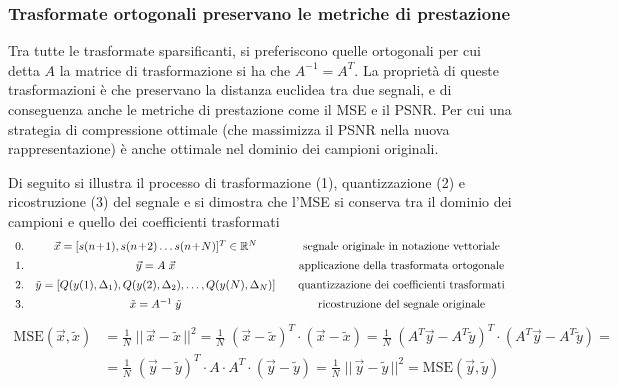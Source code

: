\subsubsection*{Trasformate ortogonali preservano le metriche di prestazione}
Tra tutte le trasformate sparsificanti, si preferiscono quelle ortogonali per cui detta \(A\) la matrice di trasformazione
si ha che \(A^{-1} = A^T\). La proprietà di queste trasformazioni è che preservano la distanza euclidea tra due segnali,
e di conseguenza anche le metriche di prestazione come il MSE e il PSNR. Per cui una strategia di compressione ottimale
(che massimizza il PSNR nella nuova rappresentazione) è anche ottimale nel dominio dei campioni originali.

Di seguito si illustra il processo di trasformazione (1), quantizzazione (2) e ricostruzione (3) del segnale e si dimostra
che l'MSE si conserva tra il dominio dei campioni e quello dei coefficienti trasformati
\[\begin{array}{c c c}
	0. & \vec{x} = [s(n\!+\!1), s(n\!+\!2) \ldots s(n\!+\!N)]^T \in \mathbb{R}^N
	& \quad \text{segnale originale in notazione vettoriale}
	\\[5pt]
	1. & \vec{y} = A \; \vec{x}
	& \quad \text{applicazione della trasformata ortogonale}
	\\[5pt]
	2. & \tilde{y} = [Q(y(1), \Delta_1), Q(y(2), \Delta_2), \ldots, Q(y(N), \Delta_N)]
	& \quad \text{quantizzazione dei coefficienti trasformati}
	\\[5pt]
	3. & \tilde{x} = A^{-1} \; \tilde{y}
	& \quad \text{ricostruzione del segnale originale}
\end{array}\]
\vspace{-10pt}
\begin{align*}
	\text{MSE}(\vec{x}, \tilde{x}) &= \frac{1}{N} \; || \, \vec{x} - \tilde{x} \, ||^2 = \frac{1}{N} \; (\vec{x} - \tilde{x})^T \cdot (\vec{x} - \tilde{x}) = \frac{1}{N} \; (A^T \vec{y} - A^T \tilde{y})^T \cdot (A^T \vec{y} - A^T \tilde{y}) = \\
	&= \frac{1}{N} \; (\vec{y} - \tilde{y})^T \cdot A \cdot A^T \cdot (\vec{y} - \tilde{y}) = \frac{1}{N} \; || \, \vec{y} - \tilde{y} \, ||^2 = \text{MSE}(\vec{y}, \tilde{y})
\end{align*}

